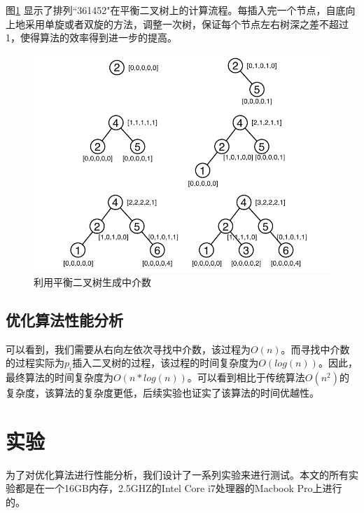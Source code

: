 \documentclass[10pt, twocolumn]{ctexart}
\begin{document}
图\ref{example2} 显示了排列``361452"在平衡二叉树上的计算流程。每插入完一个节点，自底向上地采用单旋或者双旋的方法，调整一次树，保证每个节点左右树深之差不超过1，使得算法的效率得到进一步的提高。
\begin{figure}[H]
\centering
\includegraphics[width=0.9\columnwidth]{pictures/example2.pdf}
\caption{利用平衡二叉树生成中介数}
\label{example2}
\end{figure}
\subsection{优化算法性能分析}
可以看到，我们需要从右向左依次寻找中介数，该过程为$O(n)$。而寻找中介数的过程实际为$p_i$插入二叉树的过程，该过程的时间复杂度为$O(log(n))$。因此，最终算法的时间复杂度为$O(n*log(n))$。可以看到相比于传统算法$O(n^2)$的复杂度，该算法的复杂度更低，后续实验也证实了该算法的时间优越性。



\section{实验}
为了对优化算法进行性能分析，我们设计了一系列实验来进行测试。本文的所有实验都是在一个16GB内存，2.5GHZ的Intel Core i7处理器的Macbook Pro上进行的。
\end{document}
